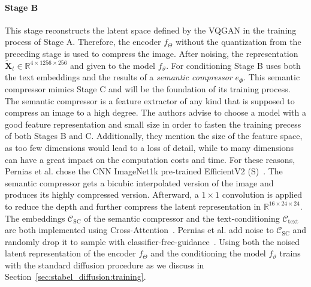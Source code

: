 \paragraph*{Stage B} This stage reconstructs the latent space defined by the
VQGAN in the training process of Stage A. Therefore, the encoder $f_{\Theta}$
without the quantization from the preceding stage is used to compress the image.
After noising, the representation $\tilde{\boldsymbol{X}}_t\in\mathbb{R}^{4\times1256\times256}$ and given to the model $f_\vartheta$. For
conditioning Stage B uses both the text embeddings and the results of a
\emph{semantic compressor} $e_{\Phi}$. This semantic compressor mimics Stage C and will be
the foundation of its training process.\\

The semantic compressor is a feature extractor of any kind that is supposed to
compress an image to a high degree. The authors advise to choose a model with a
good feature representation and small size in order to fasten the training
precess of both Stages B and C. Additionally, they mention the size of the
feature space, as too few dimensions would lead to a loss of detail, while to
many dimensions can have a great impact on the computation costs and time. For
these reasons, Pernias et al. chose the CNN ImageNet1k pre-trained EfficientV2 (S)~\cite{Tan2021EfficientNetV2}.
The semantic compressor gets a bicubic interpolated version of the image and
produces its highly compressed version. Afterward, a $1\times1$ convolution is
applied to reduce the depth and further compress the latent representation in $\mathbb{R}^{16\times24\times24}$. \\

The embeddings $\mathcal{C}_{\text{SC}}$ of the semantic compressor and the
text-conditioning $\mathcal{C}_{\text{text}}$ are both implemented using Cross-Attention~\cite{vaswani2023attentionneed}.
Pernias et al. add noise to $\mathcal{C}_{\text{SC}}$ and randomly drop it to
sample with classifier-free-guidance~\cite{ho2022classifierfreediffusionguidance}.
Using both the noised latent representation of the encoder $f_\Theta$ and the
conditioning the model $f_\vartheta$ trains with the standard diffusion
procedure as we discuss in Section~\ref{sec:stabel_diffusion:training}.

